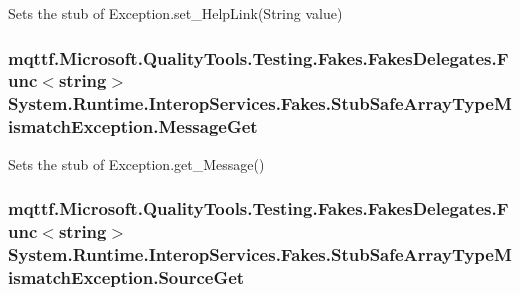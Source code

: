 Sets the stub of Exception.\-set\-\_\-\-Help\-Link(\-String value)

\hypertarget{class_system_1_1_runtime_1_1_interop_services_1_1_fakes_1_1_stub_safe_array_type_mismatch_exception_ae31e900e8a613ac29188a87d63884a1c}{
\subsubsection[{Message\-Get}]{\setlength{\rightskip}{0pt plus 5cm}mqttf.\-Microsoft.\-Quality\-Tools.\-Testing.\-Fakes.\-Fakes\-Delegates.\-Func$<$string$>$ System.\-Runtime.\-Interop\-Services.\-Fakes.\-Stub\-Safe\-Array\-Type\-Mismatch\-Exception.\-Message\-Get}}\label{class_system_1_1_runtime_1_1_interop_services_1_1_fakes_1_1_stub_safe_array_type_mismatch_exception_ae31e900e8a613ac29188a87d63884a1c}


Sets the stub of Exception.\-get\-\_\-\-Message()

\hypertarget{class_system_1_1_runtime_1_1_interop_services_1_1_fakes_1_1_stub_safe_array_type_mismatch_exception_a1255123a5d34ede0bcef3ba84734f398}{
\subsubsection[{Source\-Get}]{\setlength{\rightskip}{0pt plus 5cm}mqttf.\-Microsoft.\-Quality\-Tools.\-Testing.\-Fakes.\-Fakes\-Delegates.\-Func$<$string$>$ System.\-Runtime.\-Interop\-Services.\-Fakes.\-Stub\-Safe\-Array\-Type\-Mismatch\-Exception.\-Source\-Get}}\label{class_system_1_1_runtime_1_1_interop_services_1_1_fakes_1_1_stub_safe_array_type_mismatch_exception_a1255123a5d34ede0bcef3ba84734f398}


